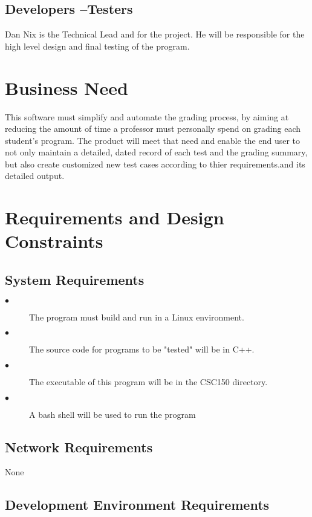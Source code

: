 \subsection{Developers --Testers}
Dan Nix is the Technical Lead and for the project.  He will be responsible for the high level design and final
testing of the program.

\section{Business Need}
This software must simplify and automate the grading process, by aiming at reducing the amount of time a professor must personally spend on grading each student's program.  The product will meet that need and enable 
the end user to not only maintain a detailed, dated record of each test and the grading summary, but also create customized new test cases according to thier requirements.and its detailed output.

\section{Requirements and Design Constraints}

\subsection{System  Requirements}

\begin{description}
\item [$\bullet$] The program must build and run in a Linux environment.
\item [$\bullet$] The source code for programs to be "tested" will be in C++.
\item [$\bullet$] The executable of this program will be in the CSC150 directory.
\item [$\bullet$] A bash shell will be used to run the program
\end{description}

\subsection{Network Requirements}
None


\subsection{Development Environment Requirements}

